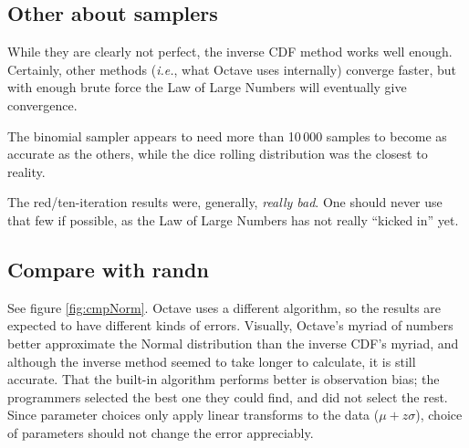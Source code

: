 \documentclass[letterpaper]{article}
\begin{document}
\subsection{Other about samplers}
\label{subsec:othersamplers}

While they are clearly not perfect, the inverse CDF method works well enough.
Certainly, other methods (\emph{i.e.}, what Octave uses internally) converge
faster, but with enough brute force the Law of Large Numbers will eventually
give convergence.

The binomial sampler appears to need more than 10\,000 samples to become as
accurate as the others, while the dice rolling distribution was the closest to
reality.

The red/ten-iteration results were, generally, \emph{really bad}.  One should
never use that few if possible, as the Law of Large Numbers has not really
``kicked in'' yet.

\subsection{Compare with randn}
\label{subsec:randn}

See figure \ref{fig:cmpNorm}.  Octave uses a different algorithm, so the results
are expected to have different kinds of errors.  Visually, Octave's myriad of
numbers better approximate the Normal distribution than the inverse CDF's
myriad, and although the inverse method seemed to take longer to calculate, it
is still accurate.  That the built-in algorithm performs better is observation
bias; the programmers selected the best one they could find, and did not select
the rest.  Since parameter choices only apply linear transforms to the data
($\mu+z\sigma$), choice of parameters should not change the error appreciably.
\end{document}
